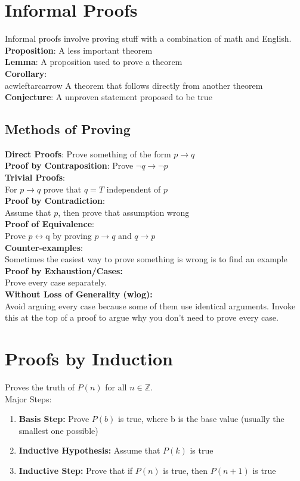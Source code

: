 \documentclass[letter]{article}
\begin{document}
\begin{multicols}{2}

  \section{Informal Proofs}
  Informal proofs involve proving stuff with a combination of math and English.
  \\
  \textbf{Proposition}: A less important theorem \\
  \textbf{Lemma}: A proposition used to prove a theorem \\
  \textbf{Corollary}:\\acwleftarcarrow A theorem that follows directly from another theorem \\
  \textbf{Conjecture}: A unproven statement proposed to be true

  \subsection{Methods of Proving}
  \textbf{Direct Proofs}: Prove something of the form $p \rightarrow q$ \\
  \textbf{Proof by Contraposition}: Prove $\neg q \rightarrow \neg p$ \\
  \textbf{Trivial Proofs}:\\ For $p \rightarrow q$ prove that $q = T$ independent
  of $p$ \\
  \textbf{Proof by Contradiction}:\\ Assume that $p$, then prove that assumption
  wrong \\
  \textbf{Proof of Equivalence}:\\ Prove $p \leftrightarrow $q by proving
  $p \rightarrow q$ and $q \rightarrow p$ \\
  \textbf{Counter-examples}:\\ Sometimes the easiest way to prove something is
  wrong is to find an example\\
  \textbf{Proof by Exhaustion/Cases:}\\ Prove every case separately.\\
  \textbf{Without Loss of Generality (wlog):}\\ Avoid arguing every case
  because some of them use identical arguments. Invoke this at the top
  of a proof to argue why you don't need to prove every case.

  \section{Proofs by Induction} 
  Proves the truth of $P(n)$ for all $n \in \mathbb{Z}$.\\
  Major Steps:
  \begin{enumerate} 
    \item \textbf{Basis Step:} Prove $P(b)$ is true, where b is the base value
          (usually the smallest one possible)
    \item \textbf{Inductive Hypothesis:} Assume that $P(k)$ is true
    \item \textbf{Inductive Step:} Prove that if $P(n)$ is true, then $P(n + 1)$
          is true
  \end{enumerate}


\end{multicols}
\end{document}
